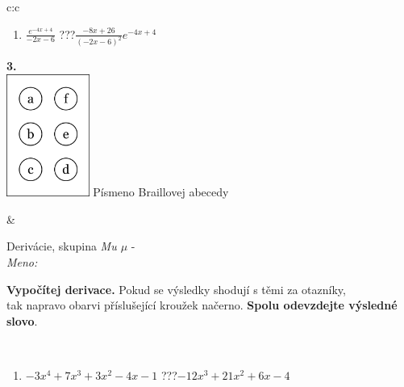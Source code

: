 \documentclass[10pt]{report}
\begin{document}
\begin{tabular}{c:c}
\begin{minipage}[c][104.5mm][t]{0.5\linewidth}
\begin{center}
\begin{minipage}{0.79\linewidth}
\begin{center}
\begin{varwidth}{\linewidth}
\begin{enumerate}
\item $\frac{e^{-4x+4}}{-2x-6}$\quad \dotfill\; ???\;\dotfill \quad $\frac{-8x+26}{(-2x-6)^2}e^{-4x+4}$
\end{enumerate}
\end{varwidth}
\end{center}
\end{minipage}
\begin{minipage}{0.20\linewidth}
\begin{center}
{\Huge\bfseries 3.} \\[2mm]
\includegraphics[height=40mm]{../images/braille.png}
{\small Písmeno Braillovej abecedy}
\end{center}
\end{minipage}
\end{center}
\end{minipage}
&
\begin{minipage}[c][104.5mm][t]{0.5\linewidth}
\begin{center}
\vspace{7mm}
{\huge Derivácie, skupina \textit{Mu $\mu$} -}\\[5mm]
\textit{Meno:}\phantom{xxxxxxxxxxxxxxxxxxxxxxxxxxxxxxxxxxxxxxxxxxxxxxxxxxxxxxxxxxxxxxxxx}\\[5mm]
\begin{minipage}{0.95\linewidth}
\begin{center}
\textbf{Vypočítej derivace.} Pokud se výsledky shodují s těmi za otazníky,\\tak napravo obarvi příslušející kroužek načerno. \textbf{Spolu odevzdejte výsledné slovo}.
\end{center}
\end{minipage}
\\[1mm]
\begin{minipage}{0.79\linewidth}
\begin{center}
\begin{varwidth}{\linewidth}
\begin{enumerate}
\normalsize
\item $-3x^4+7x^3+3x^2-4x-1$\quad \dotfill\; ???\;\dotfill \quad $-12x^3+21x^2+6x-4$

\end{enumerate}
\end{varwidth}
\end{center}
\end{minipage}
\end{center}
\end{minipage}
\end{tabular}
\end{document}
